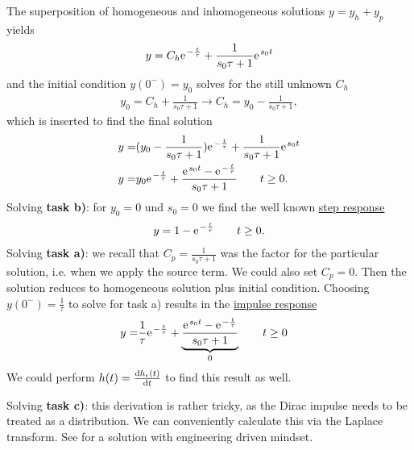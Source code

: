 \documentclass[11pt,a4paper,DIV=12]{scrartcl}
\begin{document}
The superposition of homogeneous and inhomogeneous solutions $y = y_h + y_p$ yields
\begin{align}
y = C_h \e^{- \frac{t}{\tau}} + \frac{1}{s_0 \tau + 1} \e^{s_0 t}
\end{align}
and the initial condition $y(0^-)=y_0$ solves for the still unknown $C_h$
%
\begin{align}
y_0 = C_h + \frac{1}{s_0 \tau + 1} \rightarrow C_h = y_0 - \frac{1}{s_0 \tau + 1},
\end{align}
which is inserted to find the final solution
\begin{align}
y =& (y_0 - \frac{1}{s_0 \tau + 1}) \e^{-\frac{t}{\tau}} + \frac{1}{s_0 \tau + 1} \e^{s_0 t}\\
\label{eq:taskd_final}
y =& y_0 \e^{-\frac{t}{\tau}} + \frac{\e^{s_0 t} - \e^{-\frac{t}{\tau}}}{s_0 \tau + 1} \qquad t \geq 0.
\end{align}
%
Solving \textbf{task b)}: for $y_0=0$ und $s_0 = 0$ we find the well known \underline{step response}
\begin{align}
y = 1 - \e^{-\frac{t}{\tau}} \qquad t \geq 0.
\end{align}
Solving \textbf{task a)}: we recall that $C_p=\frac{1}{s_0 \tau + 1}$ was the factor for the
particular solution, i.e. when we apply the source term. We could also set $C_p=0$. Then the solution reduces to
homogeneous solution plus initial condition. Choosing $y(0^-)=\frac{1}{\tau}$ to solve for task a) results in the \underline{impulse response}
\begin{align}
y =& \frac{1}{\tau} \e^{-\frac{t}{\tau}} + \underbrace{\frac{\e^{s_0 t} - \e^{-\frac{t}{\tau}}}{s_0 \tau + 1}}_{0}  \qquad t \geq 0
\end{align}
We could perform $h(t) = \frac{\mathrm{d} h_\epsilon(t)}{\mathrm{d} t}$ to find this result as well.

Solving \textbf{task c)}: this derivation is rather tricky, as the Dirac impulse needs to be treated as a distribution. We can conveniently calculate this via the Laplace transform. See \cite{Strang2014} for a solution with engineering driven mindset.
\end{document}
